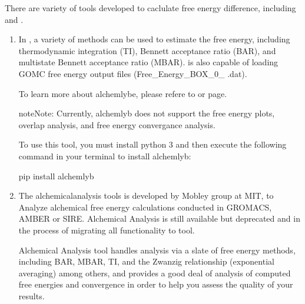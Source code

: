 \documentclass[letterpaper,10pt,english]{sphinxmanual}
\begin{document}
There are variety of tools developed to caclulate free energy difference, including
 and
 .
\begin{enumerate}
%
\item {} 

In  , a variety of methods can be
used to estimate the free energy, including thermodynamic integration (TI),
Bennett acceptance ratio (BAR), and multistate Bennett acceptance ratio (MBAR).
  is also capable of loading GOMC
free energy output files (Free\_Energy\_BOX\_0\_ .dat).

To learn more about alchemlybe, please refere to 
or  page.

\begin{sphinxadmonition}{note}{Note:}
Currently, alchemlyb does not support the free energy plots, overlap analysis,
and free energy convergance analysis.
\end{sphinxadmonition}

To use this tool, you must install python 3 and then execute the following command in
your terminal to install alchemlyb:

\begin{sphinxVerbatim}[commandchars=\\\{\}]
\PYGZdl{} pip install alchemlyb
\end{sphinxVerbatim}

\item {} 

The alchemical\sphinxhyphen{}analysis tools is developed by Mobley group at MIT, to Analyze alchemical free energy
calculations conducted in GROMACS, AMBER or SIRE. Alchemical Analysis is still available but deprecated and
in the process of migrating all functionality to  tool.

Alchemical Analysis tool handles analysis via a slate of free energy methods, including BAR,
MBAR, TI, and the Zwanzig relationship (exponential averaging) among others, and provides a good deal
of analysis of computed free energies and convergence in order to help you assess the quality of your results.


\end{enumerate}
\end{document}
